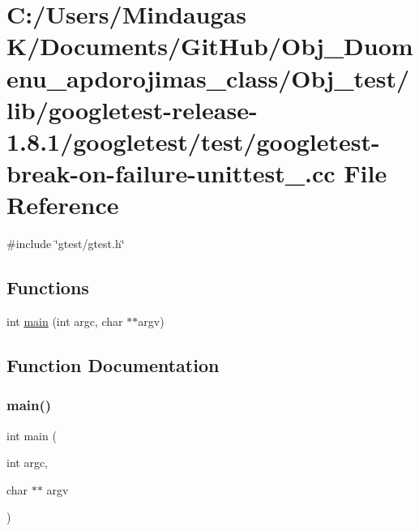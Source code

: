 \hypertarget{_obj__test_2lib_2googletest-release-1_88_81_2googletest_2test_2googletest-break-on-failure-unittest___8cc}{}\section{C\+:/\+Users/\+Mindaugas K/\+Documents/\+Git\+Hub/\+Obj\+\_\+\+Duomenu\+\_\+apdorojimas\+\_\+class/\+Obj\+\_\+test/lib/googletest-\/release-\/1.8.1/googletest/test/googletest-\/break-\/on-\/failure-\/unittest\+\_\+.cc File Reference}
\label{_obj__test_2lib_2googletest-release-1_88_81_2googletest_2test_2googletest-break-on-failure-unittest___8cc}
{\ttfamily \#include \char`\"{}gtest/gtest.\+h\char`\"{}}\newline
\subsection*{Functions}
\begin{DoxyCompactItemize}
\item 
int \mbox{\hyperlink{_obj__test_2lib_2googletest-release-1_88_81_2googletest_2test_2googletest-break-on-failure-unittest___8cc_a3c04138a5bfe5d72780bb7e82a18e627}{main}} (int argc, char $\ast$$\ast$argv)
\end{DoxyCompactItemize}


\subsection{Function Documentation}
\mbox{\label{_obj__test_2lib_2googletest-release-1_88_81_2googletest_2test_2googletest-break-on-failure-unittest___8cc_a3c04138a5bfe5d72780bb7e82a18e627}} 
\subsubsection{\texorpdfstring{main()}{main()}}
{\footnotesize\ttfamily int main (\begin{DoxyParamCaption}\item[{int}]{argc,  }\item[{char $\ast$$\ast$}]{argv }\end{DoxyParamCaption})}

